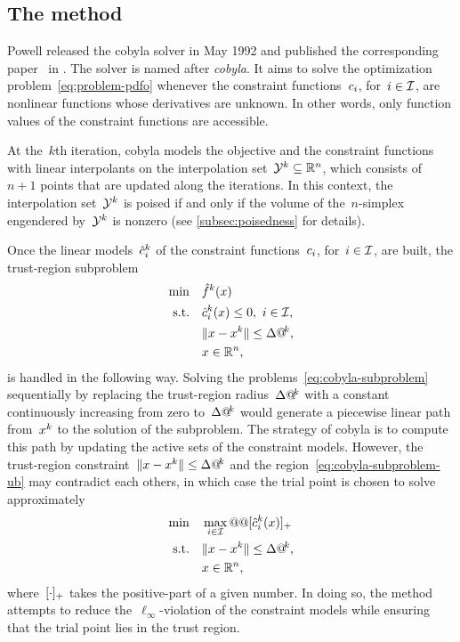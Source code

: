 \subsection{The  method}
\label{subsec:cobyla}

Powell released the \gls{cobyla} solver in May 1992 and published the corresponding paper~\cite{Powell_1994} in .
The solver is named after \emph{\glsdesc{cobyla}}.
It aims to solve the optimization problem~\cref{eq:problem-pdfo} whenever the constraint functions~$c_{i}$, for~$i \in \mathcal{I}$, are nonlinear functions whose derivatives are unknown.
In other words, only function values of the constraint functions are accessible.

At the~$k$th iteration, \gls{cobyla} models the objective and the constraint functions with linear interpolants on the interpolation set~$\xpt[k] \subseteq \R^n$, which consists of~$n + 1$ points that are updated along the iterations.
In this context, the interpolation set~$\xpt[k]$ is poised if and only if the volume of the~$n$-simplex engendered by~$\xpt[k]$ is nonzero (see \cref{subsec:poisedness} for details).

Once the linear models~$\conm[k]{i}$ of the constraint functions~$c_{i}$, for~$i \in \mathcal{I}$, are built, the trust-region subproblem
\begin{subequations}
    \label{eq:cobyla-subproblem}
    \begin{align}
        \min        & \quad \objm[k](\iter)\\
        \text{s.t.} & \quad \conm[k]{i}(\iter) \le 0, ~ i \in \iub, \label{eq:cobyla-subproblem-ub}\\
                    & \quad \norm{\iter - \iter[k]} \le \rad[k],\\
                    & \quad \iter \in \R^n, \nonumber
    \end{align}
\end{subequations}
is handled in the following way.
Solving the problems~\cref{eq:cobyla-subproblem} sequentially by replacing the trust-region radius~$\rad[k]$ with a constant continuously increasing from zero to~$\rad[k]$ would generate a piecewise linear path from~$\iter[k]$ to the solution of the subproblem.
The strategy of \gls{cobyla} is to compute this path by updating the active sets of the constraint models.
However, the trust-region constraint~$\norm{\iter - \iter[k]} \le \rad[k]$ and the region~\cref{eq:cobyla-subproblem-ub} may contradict each others, in which case the trial point is chosen to solve approximately
\begin{align*}
    \min        & \quad \max_{i \in \iub} @@ \posp{\conm[k]{i}(\iter)}\\
    \text{s.t.} & \quad \norm{\iter - \iter[k]} \le \rad[k],\\
                & \quad \iter \in \R^n,
\end{align*}
%
where~$[\cdot]_+$ takes the positive-part of a given number.
In doing so, the method attempts to reduce the~$\ell_{\infty}$-violation of the constraint models while ensuring that the trial point lies in the trust region.

